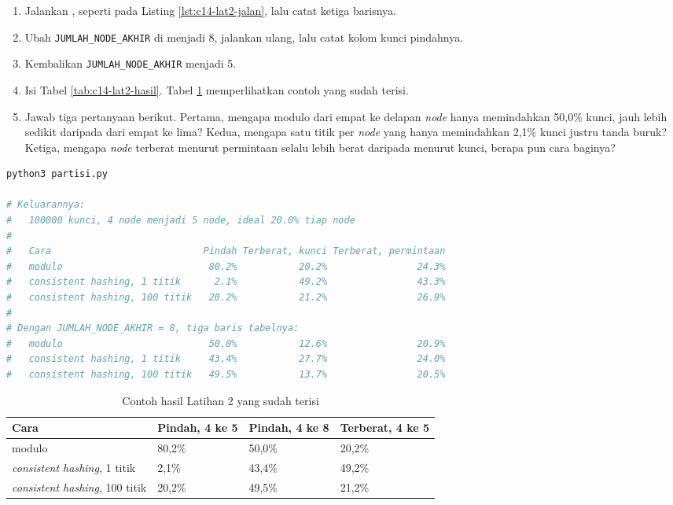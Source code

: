 \begin{enumerate}
  \item Jalankan , seperti pada Listing
        \ref{lst:c14-lat2-jalan}, lalu catat ketiga barisnya.
  \item Ubah \texttt{JUMLAH\_NODE\_AKHIR} di  menjadi 8,
        jalankan ulang, lalu catat kolom kunci pindahnya.
  \item Kembalikan \texttt{JUMLAH\_NODE\_AKHIR} menjadi 5.
  \item Isi Tabel \ref{tab:c14-lat2-hasil}. Tabel \ref{tab:c14-lat2-contoh}
        memperlihatkan contoh yang sudah terisi.
  \item Jawab tiga pertanyaan berikut. Pertama, mengapa modulo dari empat ke
        delapan \textit{node} hanya memindahkan 50,0\% kunci, jauh lebih sedikit
        daripada dari empat ke lima? Kedua, mengapa satu titik per \textit{node} yang
        hanya memindahkan 2,1\% kunci justru tanda buruk? Ketiga, mengapa
        \textit{node} terberat menurut permintaan selalu lebih berat daripada menurut
        kunci, berapa pun cara baginya?
\end{enumerate}

\begin{lstlisting}[language=bash, caption={Membandingkan dua cara membagi data, tersedia di \berkas{sources/chapter14/partisi.py}}, label={lst:c14-lat2-jalan}]
python3 partisi.py

# Keluarannya:
#   100000 kunci, 4 node menjadi 5 node, ideal 20.0% tiap node
#
#   Cara                           Pindah Terberat, kunci Terberat, permintaan
#   modulo                          80.2%           20.2%                24.3%
#   consistent hashing, 1 titik      2.1%           49.2%                43.3%
#   consistent hashing, 100 titik   20.2%           21.2%                26.9%
#
# Dengan JUMLAH_NODE_AKHIR = 8, tiga baris tabelnya:
#   modulo                          50.0%           12.6%                20.9%
#   consistent hashing, 1 titik     43.4%           27.7%                24.0%
#   consistent hashing, 100 titik   49.5%           13.7%                20.5%
\end{lstlisting}

\begin{table}[!htb]
  \centering
  \caption{Contoh hasil Latihan 2 yang sudah terisi}
  \label{tab:c14-lat2-contoh}
  \begin{tabularx}{\textwidth}{Xlll}
    \hline
    \textbf{Cara} & \textbf{Pindah, 4 ke 5} & \textbf{Pindah, 4 ke 8} & \textbf{Terberat, 4 ke 5} \\
    \hline
    modulo & 80,2\% & 50,0\% & 20,2\% \\
    \hline
    \textit{consistent hashing}, 1 titik & 2,1\% & 43,4\% & 49,2\% \\
    \hline
    \textit{consistent hashing}, 100 titik & 20,2\% & 49,5\% & 21,2\% \\
    \hline
  \end{tabularx}
\end{table}

